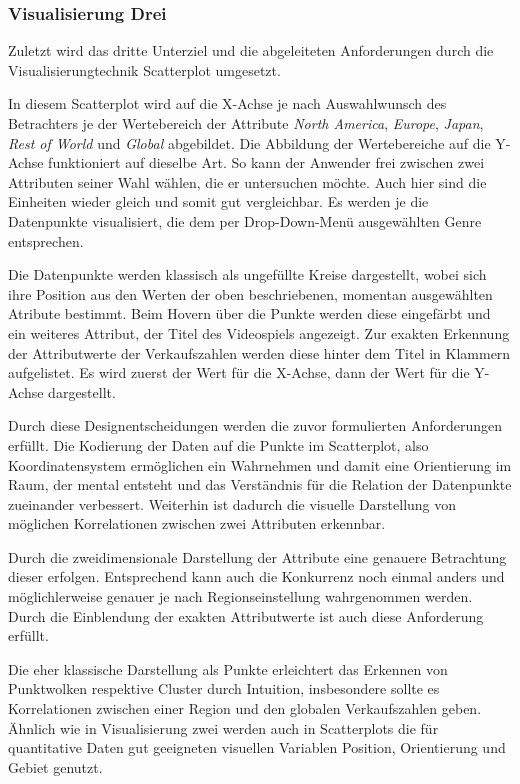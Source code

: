 \documentclass[usegeometry=true]{scrartcl}
\begin{document}
\subsubsection{Visualisierung Drei}
Zuletzt wird das dritte Unterziel und die abgeleiteten Anforderungen durch die Visualisierungtechnik Scatterplot umgesetzt. 

In diesem Scatterplot wird auf die X-Achse je nach Auswahlwunsch des Betrachters je der Wertebereich der Attribute \textit{North America}, \textit{Europe}, \textit{Japan}, \textit{Rest of World} und \textit{Global} abgebildet.
Die Abbildung der Wertebereiche auf die Y-Achse funktioniert auf dieselbe Art. So kann der Anwender frei zwischen zwei Attributen seiner Wahl wählen, die er untersuchen möchte.
Auch hier sind die Einheiten wieder gleich und somit gut vergleichbar. 
Es werden je die Datenpunkte visualisiert, die dem per Drop-Down-Menü ausgewählten Genre entsprechen. 

Die Datenpunkte werden klassisch als ungefüllte Kreise dargestellt, wobei sich ihre Position aus den Werten der oben beschriebenen, momentan ausgewählten Atribute bestimmt. 
Beim Hovern über die Punkte werden diese eingefärbt und ein weiteres Attribut, der Titel des Videospiels angezeigt. 
Zur exakten Erkennung der Attributwerte der Verkaufszahlen werden diese hinter dem Titel in Klammern aufgelistet. 
Es wird zuerst der Wert für die X-Achse, dann der Wert für die Y-Achse dargestellt.

Durch diese Designentscheidungen werden die zuvor formulierten Anforderungen erfüllt. 
Die Kodierung der Daten auf die Punkte im Scatterplot, also Koordinatensystem ermöglichen ein Wahrnehmen und damit eine Orientierung im Raum, der mental entsteht und das Verständnis für die Relation der Datenpunkte zueinander verbessert.
Weiterhin ist dadurch die visuelle Darstellung von möglichen Korrelationen zwischen zwei Attributen erkennbar. 

Durch die zweidimensionale Darstellung der Attribute eine genauere Betrachtung dieser erfolgen. 
Entsprechend kann auch die Konkurrenz noch einmal anders und möglichlerweise genauer je nach Regionseinstellung wahrgenommen werden.
Durch die Einblendung der exakten Attributwerte ist auch diese Anforderung erfüllt. 

Die eher klassische Darstellung als Punkte erleichtert das Erkennen von Punktwolken respektive Cluster durch Intuition, insbesondere sollte es Korrelationen zwischen einer Region und den globalen Verkaufszahlen geben. 
Ähnlich wie in Visualisierung zwei werden auch in Scatterplots die für quantitative Daten gut geeigneten visuellen Variablen Position, Orientierung und Gebiet genutzt. 
\end{document}
